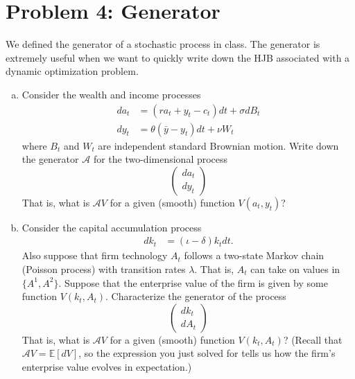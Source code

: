 \documentclass[11pt]{extarticle}
\theoremstyle{plain}
\theoremstyle{definition}
\begin{document}
\vspace{5mm}
\section*{Problem 4: Generator}

We defined the generator of a stochastic process in class. The generator is extremely useful when we want to quickly write down the HJB associated with a dynamic optimization problem. 

\vspace{4mm}
\begin{enumerate}[(a)]
\item Consider the wealth and income processes 
\begin{align*}
	da_t &= (ra_t + y_t - c_t)dt + \sigma dB_t \\
	dy_t &= \theta (\bar y - y_t) dt + \nu W_t
\end{align*}
where $B_t$ and $W_t$ are independent standard Brownian motion. Write down the generator $\mathcal A$ for the two-dimensional process
\begin{equation*}
	\begin{pmatrix}
		d a_t \\
		d y_t 
	\end{pmatrix}
\end{equation*}
That is, what is $\mathcal A V$ for a given (smooth) function $V(a_t, y_t)$?

\item Consider the capital accumulation process
\begin{align*}
	dk_t &= (\iota - \delta) k_t dt. 
\end{align*}
Also suppose that firm technology $A_t$ follows a two-state Markov chain (Poisson process) with transition rates $\lambda$. That is, $A_t$ can take on values in $\{A^1, A^2\}$. Suppose that the enterprise value of the firm is given by some function $V(k_t, A_t)$. Characterize the generator of the process
\begin{equation*}
	\begin{pmatrix}
		d k_t \\
		d A_t 
	\end{pmatrix}
\end{equation*}
That is, what is $\mathcal A V$ for a given (smooth) function $V(k_t, A_t)$? (Recall that $\mathcal A V = \mathbb E[d V]$, so the expression you just solved for tells us how the firm's enterprise value evolves in expectation.)

\end{enumerate}
\end{document}
